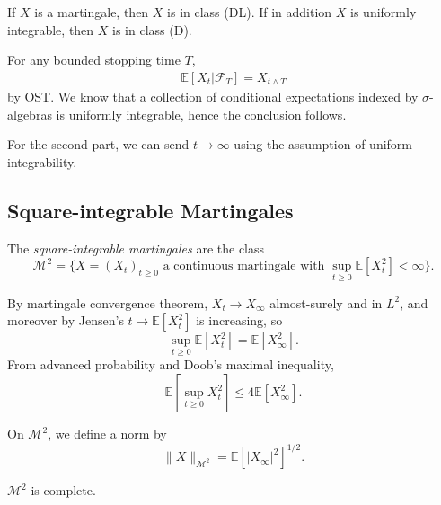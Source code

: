 \documentclass[12pt]{article}
\begin{document}
\begin{theorem}
	If $X$ is a martingale, then $X$ is in class (DL). If in addition $X$ is uniformly integrable, then $X$ is in class (D).
\end{theorem}

\begin{proofbox}
	For any bounded stopping time $T$,
	\begin{align*}
		\mathbb{E}[X_t | \mathcal{F}_T] = X_{t \wedge T}
	\end{align*}
	by OST. We know that a collection of conditional expectations indexed by $\sigma$-algebras is uniformly integrable, hence the conclusion follows.

	For the second part, we can send $t \to \infty$ using the assumption of uniform integrability.
\end{proofbox}

\subsection{Square-integrable Martingales}%
\label{sub:sim}

\begin{definition}
	The \emph{square-integrable martingales} are the class
	\[
		\mathcal{M}^2 = \{ X = (X_t)_{t \geq 0} \text{ a continuous martingale with } \sup_{t \geq 0} \mathbb{E}[X_t^2] < \infty \}.
	\]
\end{definition}
\begin{remark}
	By martingale convergence theorem, $X_t \to X_\infty$ almost-surely and in $L^2$, and moreover by Jensen's $t \mapsto \mathbb{E}[X_t^2]$ is increasing, so
	\[
	\sup_{t \geq 0} \mathbb{E}[X_t^2] = \mathbb{E}[X_\infty^2].
	\]
	From advanced probability and Doob's maximal inequality,
	\[
	\mathbb{E}[\sup_{t \geq 0} X_t^2] \leq 4 \mathbb{E}[X_\infty^2].
	\]
\end{remark}


On $\mathcal{M}^2$, we define a norm by
\[
\|X\|_{\mathcal{M}^2} = \mathbb{E}[|X_\infty|^2]^{1/2}.
\]
\begin{theorem}
	$\mathcal{M}^2$ is complete.
\end{theorem}
\end{document}
